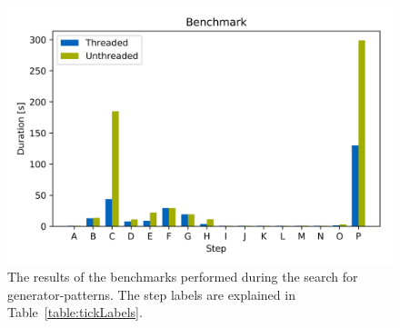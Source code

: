 \begin{figure}
	\centering
	\includegraphics[width=\linewidth]{figures/Benchmark/benchmark.png}
	\caption[Benchmark]{The results of the benchmarks performed during the search for generator-patterns. The step labels are explained in Table~\ref{table:tickLabels}.}
	\label{fig:benchmark}
\end{figure}